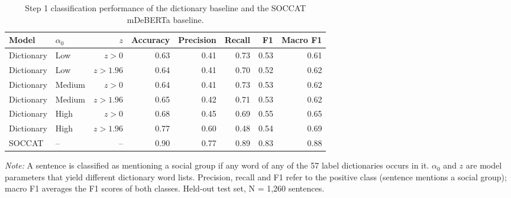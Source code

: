 \begin{table}[htb]
\centering
\begin{threeparttable}
\begin{tabular}{llrrrrrr}
\toprule
Model & $\alpha_0$ & $z$ & Accuracy & Precision & Recall & F1 & Macro F1 \\
\midrule
Dictionary & Low & $z>0$ & 0.63 & 0.41 & 0.73 & 0.53 & 0.61 \\
Dictionary & Low & $z>1.96$ & 0.64 & 0.41 & 0.70 & 0.52 & 0.62 \\
Dictionary & Medium & $z>0$ & 0.64 & 0.41 & 0.73 & 0.53 & 0.62 \\
Dictionary & Medium & $z>1.96$ & 0.65 & 0.42 & 0.71 & 0.53 & 0.62 \\
Dictionary & High & $z>0$ & 0.68 & 0.45 & 0.69 & 0.55 & 0.65 \\
Dictionary & High & $z>1.96$ & 0.77 & 0.60 & 0.48 & 0.54 & 0.69 \\
\midrule
SOCCAT & -- & -- & 0.90 & 0.77 & 0.89 & 0.83 & 0.88 \\
\bottomrule
\end{tabular}
\begin{tablenotes}[flushleft]
\footnotesize
\item \textit{Note:} A sentence is classified as mentioning a social group if any word of any of the 57 label dictionaries occurs in it. $\alpha_0$ and $z$ are model parameters that yield different dictionary word lists. Precision, recall and F1 refer to the positive class (sentence mentions a social group); macro F1 averages the F1 scores of both classes. Held-out test set, N = 1,260 sentences.
\end{tablenotes}
\end{threeparttable}
\caption{Step 1 classification performance of the dictionary baseline and the SOCCAT mDeBERTa baseline.}
\label{tab:dictionary-step1}
\end{table}
